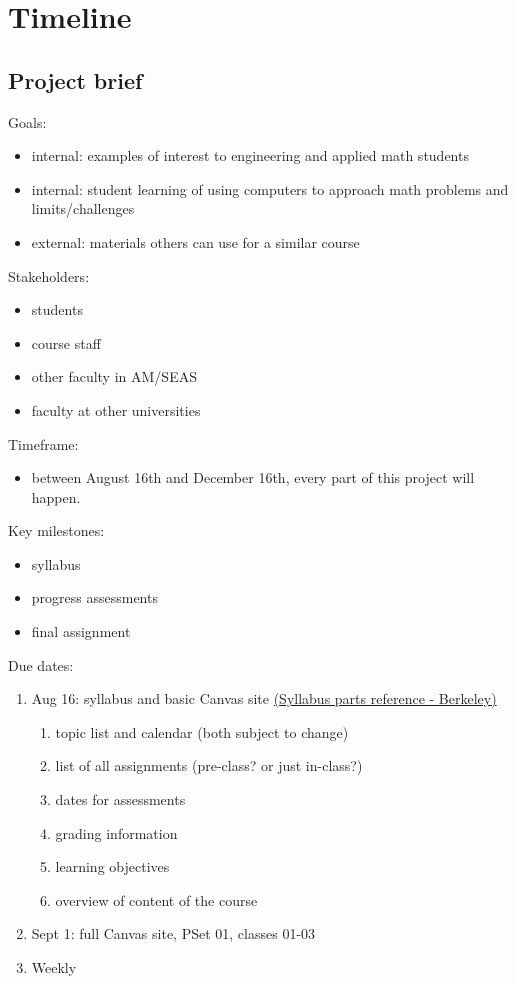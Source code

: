 \documentclass[12pt,letterpaper]{article}
\begin{document}
\section{Timeline}
\subsection{Project brief}

\noindent Goals:
\begin{itemize}
\itemsep0pt
    \item internal: examples of interest to engineering and applied math students
    \item internal: student learning of using computers to approach math problems and limits/challenges
    \item external: materials others can use for a similar course
\end{itemize}

\noindent Stakeholders:
\begin{itemize}
\itemsep0pt
    \item students
    \item course staff
    \item other faculty in AM/SEAS
    \item faculty at other universities
\end{itemize}

\noindent Timeframe:

\begin{itemize}
\itemsep0pt
    \item between August 16th and December 16th, every part of this project will happen.
\end{itemize}

\noindent Key milestones:
\begin{itemize}
\itemsep0pt
    \item syllabus
    \item progress assessments
    \item final assignment
\end{itemize}


\noindent Due dates:
\begin{enumerate}
    \item Aug 16: syllabus and basic Canvas site \href{https://teaching.berkeley.edu/sites/default/files/syllabus_components.pdf}{(Syllabus parts reference - Berkeley)}
    \begin{enumerate}
        \item topic list and calendar (both subject to change)
        \item list of all assignments (pre-class?  or just in-class?)
        \item dates for assessments
        \item grading information
        \item learning objectives
        \item overview of content of the course
    \end{enumerate}
    \item Sept 1: full Canvas site, PSet 01, classes 01-03
    \item Weekly
\end{enumerate}
\end{document}
